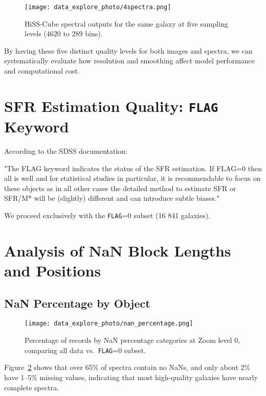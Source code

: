 \documentclass[english,bachelor,oneside]{ctufit-thesis}
\begin{document}
\begin{figure}[H]
  \centering
  \texttt{[image: data\_explore\_photo/4spectra.png]}
  \caption{HiSS-Cube spectral outputs for the same galaxy at five sampling levels (4620 to 289 bins).}
  \label{fig:hisscube_spectra}
\end{figure}

By having these five distinct quality levels for both images and spectra, we can systematically evaluate how resolution and smoothing affect model performance and computational cost.


\section{SFR Estimation Quality: \texttt{FLAG} Keyword}
According to the SDSS documentation:

\begin{displayquote}
"The FLAG keyword indicates the status of the SFR estimation. If FLAG=0 then all is well and for statistical studies in particular, it is recommendable to focus on these objects as in all other cases the detailed method to estimate SFR or SFR/M* will be (slightly) different and can introduce subtle biases." \cite{SDSS_SFR_DOC}
\end{displayquote}

We proceed exclusively with the \texttt{FLAG}=0 subset (16 841 galaxies).

\section{Analysis of NaN Block Lengths and Positions}
\subsection{NaN Percentage by Object}
\begin{figure}[H]
    \centering
    \texttt{[image: data\_explore\_photo/nan\_percentage.png]}
    \caption{Percentage of records by NaN percentage categories at Zoom level 0, comparing all data vs.\ \texttt{FLAG}=0 subset.}
    \label{fig:nan_percentage}
\end{figure}
\noindent
Figure~\ref{fig:nan_percentage} shows that over 65\% of spectra contain no NaNs, and only about 2\% have 1–5\% missing values, indicating that most high-quality galaxies have nearly complete spectra.
\end{document}
